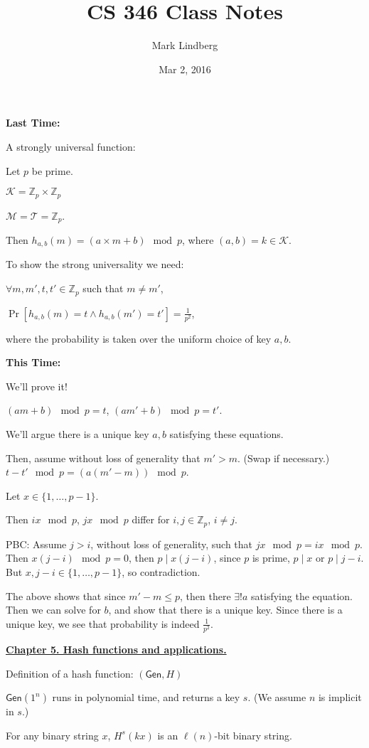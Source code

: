 \documentclass[12pt]{article}
\newcommand{\Z}{\mathbb{Z}}
\newcommand{\KKK}{\mathcal{K}}
\newcommand{\MMM}{\mathcal{M}}
\newcommand{\TTT}{\mathcal{T}}
\newcommand{\Gen}{\mathsf{Gen}}
\begin{document}
\title{CS 346 Class Notes}
\date{Mar 2, 2016}
\author{Mark Lindberg}
\maketitle
\thispagestyle{fancy}

{\bf Last Time:}

A strongly universal function:

Let $p$ be prime.
 
 $\KKK=\Z_p\times\Z_p$
 
 $\MMM=\TTT=\Z_p$.
 
 Then $h_{a,b}(m)=(a\times m+b)\mod{p}$, where $(a,b)=k\in\KKK$.
 
To show the strong universality we need:

$\forall m,m',t,t'\in\Z_p$ such that $m\neq m'$,

$\Pr[h_{a,b}(m)=t\wedge h_{a,b}(m')=t']=\frac{1}{p^2}$,

where the probability is taken over the uniform choice of key $a,b$.

{\bf This Time:}

We'll prove it!

$(am+b)\mod{p}=t$, $(am'+b)\mod{p}=t'$.

We'll argue there is a unique key $a,b$ satisfying these equations.

Then, assume without loss of generality that $m'>m$. (Swap if necessary.) $t-t'\mod{p}=(a(m'-m))\mod{p}$.

Let $x\in\{1,\dots,p-1\}$.

Then $ix\mod{p}$, $jx\mod{p}$ differ for $i,j\in\Z_p$, $i\neq j$.

PBC: Assume $j>i$, without loss of generality, such that $jx\mod{p}=ix\mod{p}$. Then $x(j-i)\mod{p}=0$, then $p\mid x(j-i)$, since $p$ is prime, $p\mid x$ or $p\mid j-i$. But $x,j-i\in\{1,\dots,p-1\}$, so contradiction.

The above shows that since $m'-m\leq p$, then there $\exists!a$ satisfying the equation. Then we can solve for $b$, and show that there is a unique key. Since there is a unique key, we see that probability is indeed $\frac{1}{p^2}$.

\underline{ \bf Chapter 5. Hash functions and applications.}

Definition of a hash function: $(\Gen, H)$

$\Gen(1^n)$ runs in polynomial time, and returns a key $s$. (We assume $n$ is implicit in $s$.)

For any binary string $x$, $H^s(kx)$ is an $\ell(n)$-bit binary string.
\end{document}
